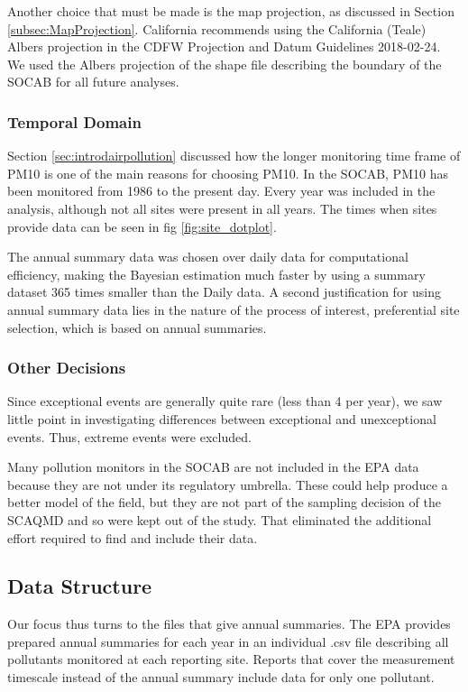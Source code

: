 \documentclass{article}
\begin{document}
Another choice that must be made is the map projection, as discussed in Section \ref{subsec:MapProjection}.  California recommends using the California (Teale) Albers projection in the CDFW Projection and Datum Guidelines 2018-02-24.  We used the Albers projection of the shape file describing the boundary of the \ac{SOCAB} for all future analyses.


\subsubsection*{Temporal Domain}
\label{subsubsec:tempdomain}
Section \ref{sec:introdairpollution} discussed how the longer monitoring time frame of \ac{PM10} is one of the main reasons for choosing \ac{PM10}.  In the \ac{SOCAB}, \ac{PM10} has been monitored from 1986 to the present day.  Every year was included in the analysis, although not all sites were  present in all years.   The times when sites provide data can be seen in fig \ref{fig:site_dotplot}.

The annual summary data was chosen over daily data for
computational efficiency, making the Bayesian estimation much faster by using a summary dataset 365 times smaller than the Daily data.  A second justification for using annual summary data lies in the nature of the process of interest, preferential site selection, which is based on annual summaries.

\subsubsection*{Other Decisions}
\label{subsubsec:otherdecisions}
Since exceptional events are generally quite rare (less than 4 per year), we saw little point in investigating differences between exceptional and unexceptional events. Thus, extreme events were excluded.

Many pollution monitors in the \ac{SOCAB} are not included in the \ac{EPA} data because they are not under its regulatory umbrella.  These could help 
produce a better model of the field, but they are not part of the sampling decision of the \ac{SCAQMD} and so were kept out of the study. That eliminated the additional effort required to find and include their data.

\subsection{Data Structure}
\label{subsec:datastructure}
Our focus thus turns to the files that give annual summaries.
The \ac{EPA} provides prepared annual summaries for each year in an individual .csv file describing all pollutants monitored at each reporting site.  Reports that cover the measurement timescale instead of the annual summary include data for only one pollutant.  
\end{document}
